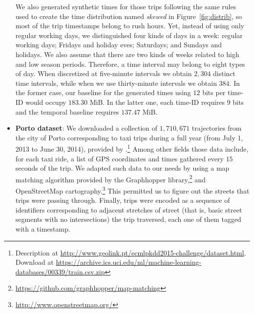 \begin{itemize}
 
We also generated synthetic times for those trips following the same rules used to create the time distribution
named \textit{skewed} in Figure~\ref{fig:distrib}, so most of the trip timestamps belong to rush hours. 
Yet, instead of using only regular working days, we distinguished four kinds of days in a week: 
regular working days; Fridays and holiday eves; Saturdays; and Sundays and holidays. We also 
assume that there are two kinds of weeks related to high and low season periods. 
Therefore, a time interval may belong to eight types of day. 
When discretized at five-minute intervals we obtain $2,\!304$ distinct time intervals, 
while when we use thirty-minute intervals we obtain $384$. In the former case, our  baseline
 for the generated times using  $12$ bits per time-ID would occupy $183.30$ MiB. In the latter one, each
time-ID requires  $9$ bits and the  temporal baseline requires $137.47$ MiB.

%
%

   \item \textbf{Porto dataset}:
    We downloaded a collection of $1,\!710,\!671 $ trajectories from the city of {Porto} corresponding to taxi trips during 
    a full year (from July 1, 2013 to June 30, 2014), provided by \cite{moreira2013predicting}.\footnote{Description at \url{http://www.geolink.pt/ecmlpkdd2015-challenge/dataset.html}. Download at \url{https://archive.ics.uci.edu/ml/machine-learning-databases/00339/train.csv.zip}} Among other
    fields those data include, for each taxi ride, a list of GPS coordinates and times gathered every $15$ seconds of
    the trip. We adapted such data to our needs by using a map matching algorithm provided by the Graphhopper library,\footnote{\url{https://github.com/graphhopper/map-matching}}
     and OpenStreetMap cartography.\footnote{\url{http://www.openstreetmap.org/}} This permitted us to
  figure out the streets that trips were passing through. Finally, trips were encoded as a sequence of identifiers
  corresponding to adjacent stretches of street (that is, basic street segments with no intersections) the trip traversed, 
  each one of them tagged with a timestamp.

  

\end{itemize}

